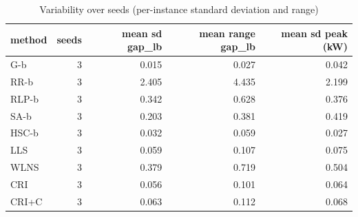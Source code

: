 \begin{table}[htbp]
\centering
\small
\caption{Variability over seeds (per-instance standard deviation and range)}
\label{tab:E4a_equal_budgets_b10_seeds}
\begin{tabular}{lrrrr}
\toprule
method & seeds & mean sd gap\_lb & mean range gap\_lb & mean sd peak (kW) \\
\midrule
G-b & 3 & 0.015 & 0.027 & 0.042 \\
RR-b & 3 & 2.405 & 4.435 & 2.199 \\
RLP-b & 3 & 0.342 & 0.628 & 0.376 \\
SA-b & 3 & 0.203 & 0.381 & 0.419 \\
HSC-b & 3 & 0.032 & 0.059 & 0.027 \\
LLS & 3 & 0.059 & 0.107 & 0.075 \\
WLNS & 3 & 0.379 & 0.719 & 0.504 \\
CRI & 3 & 0.056 & 0.101 & 0.064 \\
CRI+C & 3 & 0.063 & 0.112 & 0.068 \\
\bottomrule
\end{tabular}
\end{table}
